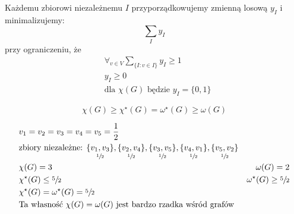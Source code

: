 \begin{definition}
Każdemu zbiorowi niezależnemu $I$ przyporządkowujemy zmienną losową $y_I$ i minimalizujemy: $$\sum _I y_I$$ przy ograniczeniu, że 
\begin{align*}
&\forall _{v\in V} \sum _{\{I:v\in I\}}y_I\geq 1\\
&y_I\geq 0\\
&\text{dla }\chi (G) \text{ będzie } y_I=\{0,1\}
\end{align*}
\end{definition}

\begin{fact}
$$\chi (G)\geq \chi ^\star(G)=\omega ^\star(G)\geq \omega (G)$$
\end{fact}

\begin{figure}[H]
\centering
{}
\end{figure}
\begin{align*}
&v_1=v_2=v_3=v_4=v_5=\frac{1}{2}\\
&\text{zbiory niezależne: } 
\underset{\sfrac{1}{2}}{\{v_1,v_3\}}, \underset{\sfrac{1}{2}}{\{v_2,v_4\}},
\underset{\sfrac{1}{2}}{\{v_3,v_5\}}, \underset{\sfrac{1}{2}}{\{v_4,v_1\}},
\underset{\sfrac{1}{2}}{\{v_5,v_2\}}\\
&\chi (G)=3 & \omega (G) = 2\\
&\chi ^\star(G)\leq \sfrac{5}{2} & \omega ^\star(G)\geq \sfrac{5}{2}\\
&\chi ^\star(G) = \omega ^\star(G)= \sfrac{5}{2}\\
&\text{Ta własność } \chi (G)=\omega (G) \text{ jest bardzo rzadka wśród grafów}
\end{align*}






